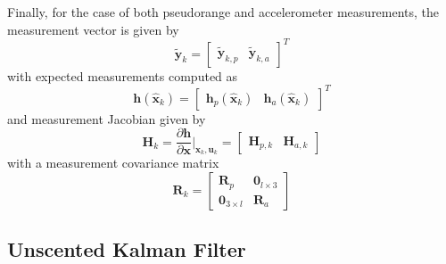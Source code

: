 \documentclass[letterpaper, paper,11pt]{AAS}		%
\begin{document}
Finally, for the case of both pseudorange and accelerometer measurements, the measurement vector is given by
\begin{equation}
	\tilde{\mathbf{y}}_k = \begin{bmatrix}
		\tilde{\mathbf{y}}_{k,p} & \tilde{\mathbf{y}}_{k,a}
	\end{bmatrix}^T
\end{equation}
with expected measurements computed as
\begin{equation}
	\mathbf{h}(\hat{\mathbf{x}}_k) = \begin{bmatrix}
		\mathbf{h}_p(\hat{\mathbf{x}}_k) & \mathbf{h}_a(\hat{\mathbf{x}}_k)
	\end{bmatrix}^T
\end{equation}
and measurement Jacobian given by 
\begin{equation}
	\mathbf{H}_k = \frac{\partial \mathbf{h}}{\partial \mathbf{x}}\bigg|_{\hat{\mathbf{x}}_k,\mathbf{u}_k} = \begin{bmatrix}
		\mathbf{H}_{p,k} & \mathbf{H}_{a,k}
	\end{bmatrix}
\end{equation}
with a measurement covariance matrix
\begin{equation}
	\mathbf{R}_k = \begin{bmatrix}
		\mathbf{R}_p & \mathbf{0}_{l\times3} \\
		\mathbf{0}_{3\times l} & \mathbf{R}_a
	\end{bmatrix}
\end{equation}

\subsection{Unscented Kalman Filter}
\end{document}
